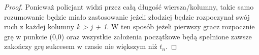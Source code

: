 \documentclass[brudnopis]{xmgr}
\newtheorem{Lemat}{Lemat} \theoremstyle{definition}
\begin{document}
\begin{proof}
	\indent Ponieważ policjant widzi przez całą długość wiersza/kolumny, takie samo rozumowanie będzie miało zastosowanie jeżeli złodziej będzie rozpoczynał swój ruch z każdej kolumny \textit{k > j + 1}. W ten sposób jeżeli pierwszy gracz rozpocznie grę w punkcie (0,0) oraz wszystkie założenia początkowe będą spełnione zawsze zakończy grę sukcesem w czasie nie większym niż \textit{$t_n$}.
\end{proof} 



\end{document}
